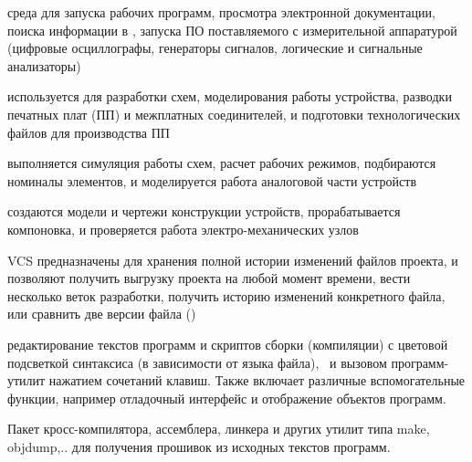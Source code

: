 \secdown\secdown


  среда для запуска рабочих программ, просмотра электронной документации, поиска
  информации в \internet, запуска ПО поставляемого с измерительной аппаратурой
  (цифровые осциллографы, генераторы сигналов, логические и сигнальные
  анализаторы)


  используется для разработки схем, моделирования работы устройства,
  разводки печатных плат (ПП) и межплатных соединителей, и подготовки
  технологических файлов для производства ПП

  
  выполняется симуляция работы схем, расчет рабочих режимов, подбираются
  номиналы элементов, и моделируется работа аналоговой части устройств
   

  создаются модели и чертежи конструкции устройств, прорабатывается
  компоновка, и проверяется работа электро-механических узлов


  VCS предназначены для хранения полной истории изменений файлов проекта, и
  позволяют получить выгрузку проекта на любой момент времени, вести несколько
  веток разработки, получить историю изменений конкретного файла, или сравнить
  две версии файла ()


  редактирование текстов программ и скриптов сборки (компиляции) с цветовой
  подсветкой синтаксиса (в зависимости от языка файла), \
  и вызовом программ-утилит нажатием сочетаний клавиш. Также включает различные
  вспомогательные функции, например отладочный интерфейс и отображение объектов
  программ.


  Пакет кросс-компилятора, ассемблера, линкера и других утилит типа make,
  objdump,.. для получения прошивок из исходных текстов программ.

\secdown
{}
\secup

